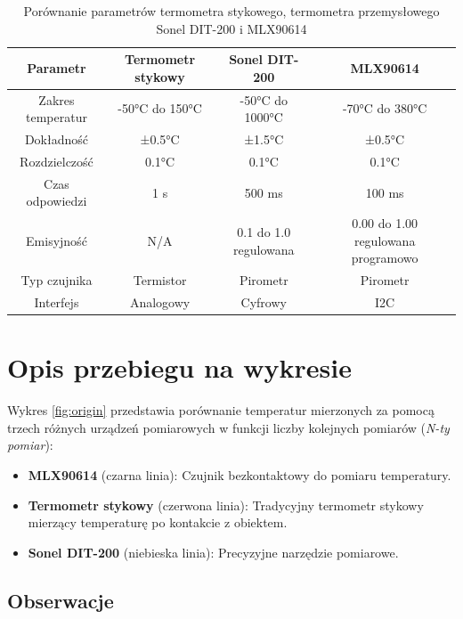 \begin{table}[h!]
    \centering
    \begin{tabularx}{\textwidth}{|C|C|C|C|} %
    \hline
    \textbf{Parametr} & \textbf{Termometr stykowy} & \textbf{Sonel DIT-200} & \textbf{MLX90614} \\
    \hline
    Zakres temperatur & -50°C do 150°C & -50°C do 1000°C & -70°C do 380°C \\
    \hline
    Dokładność & ±0.5°C & ±1.5°C & ±0.5°C \\
    \hline
    Rozdzielczość & 0.1°C & 0.1°C & 0.1°C \\
    \hline
    Czas odpowiedzi & 1 s & 500 ms & 100 ms \\
    \hline
    Emisyjność & N/A & 0.1 do 1.0 regulowana & 0.00 do 1.00 regulowana programowo \\
    \hline
    Typ czujnika & Termistor & Pirometr & Pirometr \\
    \hline
    Interfejs & Analogowy & Cyfrowy & I2C \\
    \hline
    \end{tabularx}
    \caption{Porównanie parametrów termometra stykowego, termometra przemysłowego Sonel DIT-200 i MLX90614 \cite{9} \cite{10}}
    \label{tab:parametry_termometrow}
    \end{table}

\newpage

    \section*{Opis przebiegu na wykresie}

    Wykres \ref{fig:origin} przedstawia porównanie temperatur mierzonych za pomocą trzech różnych urządzeń pomiarowych w funkcji liczby kolejnych pomiarów (\textit{N-ty pomiar}):
    
    \begin{itemize}
        \item \textbf{MLX90614} (czarna linia): Czujnik bezkontaktowy do pomiaru temperatury.
        \item \textbf{Termometr stykowy} (czerwona linia): Tradycyjny termometr stykowy mierzący temperaturę po kontakcie z obiektem.
        \item \textbf{Sonel DIT-200} (niebieska linia): Precyzyjne narzędzie pomiarowe.
    \end{itemize}
    
    \subsection*{Obserwacje}
    
